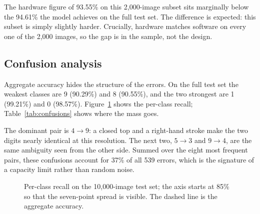 \documentclass[11pt,a4paper]{article}
\begin{document}
The hardware figure of 93.55\% on this 2,000-image subset sits marginally below the
94.61\% the model achieves on the full test set. The difference is expected:
this subset is simply slightly harder. Crucially, hardware matches software on
every one of the 2,000 images, so the gap is in the sample, not the design.

\subsection{Confusion analysis}
\label{sec:confusion}

Aggregate accuracy hides the structure of the errors. On the full test set the
weakest classes are 9 (90.29\%) and 8 (90.55\%), and the two strongest are 1
(99.21\%) and 0 (98.57\%). Figure~\ref{fig:recall} shows the per-class recall;
Table~\ref{tab:confusions} shows where the mass goes.

The dominant pair is $4\rightarrow9$: a closed top and a right-hand stroke make
the two digits nearly identical at this resolution. The next two, $5\rightarrow3$
and $9\rightarrow4$, are the same ambiguity seen from the other side. Summed
over the eight most frequent pairs, these confusions account for 37\% of all
539 errors, which is the signature of a capacity limit rather than random noise.

\begin{figure}[H]
\centering
{}
\caption{Per-class recall on the 10{,}000-image test set; the axis starts at 85\%
  so that the seven-point spread is visible. The dashed line is the aggregate
  accuracy.}
\label{fig:recall}
\end{figure}
\end{document}
